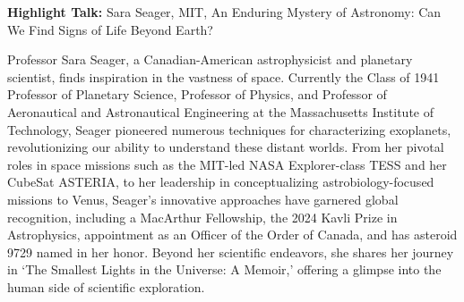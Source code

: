 \documentclass[a4paper,parskip,10pt]{scrartcl}
\begin{document}
    \begin{tcolorbox}[
        enhanced,
        title={Public Outreach Event: Next destinations for Interstellar Travel},
        sharp corners,
        colbacktitle=thistrack,
        fonttitle=\large\mediumfont,
        boxsep=0pt,
        boxrule=0pt,
        left*=0pt,
        lefttitle=4mm,
        toptitle=4mm,
        bottomtitle=4mm,
        top=0pt,
        bottom=0pt,
        sidebyside,
        sidebyside align=center,
        lefthand width=6cm,
        segmentation empty,
    ]%
        
        \tcblower

        \setlength{\parskip}{1ex}
        
        \vspace{1ex}
        \textbf{Highlight Talk:} Sara Seager, MIT, An Enduring Mystery of Astronomy: Can We Find Signs of Life Beyond Earth?

        {
            \small
            \color{white!20!black}
            Professor Sara Seager, a Canadian-American astrophysicist and planetary scientist, finds inspiration in the vastness of space. Currently the Class of 1941 Professor of Planetary Science,  Professor of Physics, and Professor of Aeronautical and Astronautical Engineering at the Massachusetts Institute of Technology, Seager pioneered numerous techniques for characterizing exoplanets, revolutionizing our ability to understand these distant worlds. From her pivotal roles in space missions such as the MIT-led NASA Explorer-class TESS and her CubeSat ASTERIA, to her leadership in conceptualizing astrobiology-focused missions to Venus, Seager’s innovative approaches have garnered global recognition, including a MacArthur Fellowship, the 2024 Kavli Prize in Astrophysics, appointment as an Officer of the Order of Canada, and has asteroid 9729 named in her honor. Beyond her scientific endeavors, she shares her journey in ‘The Smallest Lights in the Universe: A Memoir,’ offering a glimpse into the human side of scientific exploration.}


\end{tcolorbox}
\end{document}
